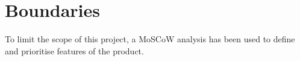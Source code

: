 
\chapter{Boundaries}
\label{sec:Boundaries}
To limit the scope of this project, a MoSCoW analysis has been used to define and prioritise features of the product.
